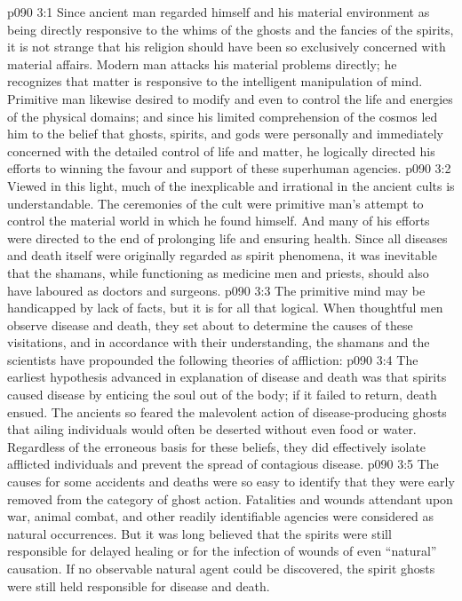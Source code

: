 \vs p090 3:1 Since ancient man regarded himself and his material environment as being directly responsive to the whims of the ghosts and the fancies of the spirits, it is not strange that his religion should have been so exclusively concerned with material affairs. Modern man attacks his material problems directly; he recognizes that matter is responsive to the intelligent manipulation of mind. Primitive man likewise desired to modify and even to control the life and energies of the physical domains; and since his limited comprehension of the cosmos led him to the belief that ghosts, spirits, and gods were personally and immediately concerned with the detailed control of life and matter, he logically directed his efforts to winning the favour and support of these superhuman agencies.
\vs p090 3:2 Viewed in this light, much of the inexplicable and irrational in the ancient cults is understandable. The ceremonies of the cult were primitive man’s attempt to control the material world in which he found himself. And many of his efforts were directed to the end of prolonging life and ensuring health. Since all diseases and death itself were originally regarded as spirit phenomena, it was inevitable that the shamans, while functioning as medicine men and priests, should also have laboured as doctors and surgeons.
\vs p090 3:3 The primitive mind may be handicapped by lack of facts, but it is for all that logical. When thoughtful men observe disease and death, they set about to determine the causes of these visitations, and in accordance with their understanding, the shamans and the scientists have propounded the following theories of affliction:
\vs p090 3:4 \bibnobreakspace {} The earliest hypothesis advanced in explanation of disease and death was that spirits caused disease by enticing the soul out of the body; if it failed to return, death ensued. The ancients so feared the malevolent action of disease\hyp{}producing ghosts that ailing individuals would often be deserted without even food or water. Regardless of the erroneous basis for these beliefs, they did effectively isolate afflicted individuals and prevent the spread of contagious disease.
\vs p090 3:5 \bibnobreakspace {} The causes for some accidents and deaths were so easy to identify that they were early removed from the category of ghost action. Fatalities and wounds attendant upon war, animal combat, and other readily identifiable agencies were considered as natural occurrences. But it was long believed that the spirits were still responsible for delayed healing or for the infection of wounds of even “natural” causation. If no observable natural agent could be discovered, the spirit ghosts were still held responsible for disease and death.
